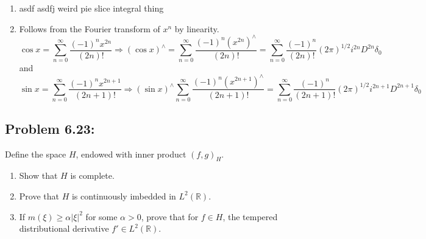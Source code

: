 \documentclass[letterpaper,twoside,11pt]{article}
\theoremstyle{mystyle}
\newcommand{\R}{{\mathbb R}}
\newcommand{\cbk}{\color{black}}
\newcommand{\cred}{\color{red}}
\begin{document}
\begin{enumerate}
  \item \cred asdf asdfj weird pie slice integral thing \cbk 
  \item Follows from the Fourier transform of $x^n$ by linearity. 
  \[\cos x = \sum\limits_{n = 0}^\infty  {\frac{{{{\left( { - 1} \right)}^n}{x^{2n}}}}{{\left( {2n} \right)!}}}  \Rightarrow {\left( {\cos x} \right)^ \wedge } = \sum\limits_{n = 0}^\infty  {\frac{{{{\left( { - 1} \right)}^n}{{\left( {{x^{2n}}} \right)}^ \wedge }}}{{\left( {2n} \right)!}}}  = \sum\limits_{n = 0}^\infty  {\frac{{{{\left( { - 1} \right)}^n}}}{{\left( {2n} \right)!}}{{\left( {2\pi } \right)}^{1/2}}{i^{2n}}{D^{2n}}{\delta _0}} \]
  and
  \[\sin x = \sum\limits_{n = 0}^\infty  {\frac{{{{\left( { - 1} \right)}^n}{x^{2n + 1}}}}{{\left( {2n + 1} \right)!}}}  \Rightarrow {\left( {\sin x} \right)^ \wedge }\sum\limits_{n = 0}^\infty  {\frac{{{{\left( { - 1} \right)}^n}{{\left( {{x^{2n + 1}}} \right)}^ \wedge }}}{{\left( {2n + 1} \right)!}}}  = \sum\limits_{n = 0}^\infty  {\frac{{{{\left( { - 1} \right)}^n}}}{{\left( {2n + 1} \right)!}}{{\left( {2\pi } \right)}^{1/2}}{i^{2n + 1}}{D^{2n + 1}}{\delta _0}} \]
\end{enumerate}

























\cbk 
\subsection*{Problem 6.23:}
Define the space $H$, endowed with inner product $\left( f,g \right)_H$. 
\begin{enumerate}
  \item Show that $H$ is complete. 
  \item Prove that $H$ is continuously imbedded in $L^2 \left( \R \right)$. 
  \item If $m(\xi) \geq \alpha |\xi|^2$ for some $\alpha >0$, prove that for $f \in H$, the tempered distributional derivative $f'\in L^2(\R)$. 
\end{enumerate}
\end{document}
